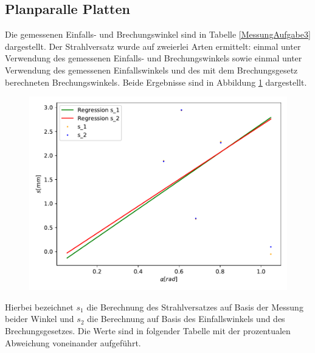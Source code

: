 \subsection{Planparalle Platten}
\label{sec:planplatteauswertung}
Die gemessenen Einfalls- und Brechungswinkel sind in Tabelle \ref{MessungAufgabe3} dargestellt. Der Strahlversatz wurde auf zweierlei Arten ermittelt: einmal unter Verwendung des gemessenen Einfalls- und Brechungswinkels sowie einmal unter Verwendung des gemessenen Einfallswinkels und des mit dem Brechungsgesetz berechneten Brechungswinkels.
Beide Ergebnisse sind in Abbildung \ref{fig:plot3ausw} dargestellt.
\begin{figure}[H]
  \centering
  \includegraphics[scale=0.7]{auswertung/plot3.pdf}
  \label{fig:plot3ausw}
\end{figure}
\noindent
Hierbei bezeichnet $s_1$ die Berechnung des Strahlversatzes auf Basis der Messung beider Winkel und $s_2$ die Berechnung auf Basis des Einfallswinkels und des Brechungsgesetzes.
Die Werte sind in folgender Tabelle mit der prozentualen Abweichung voneinander aufgeführt.

